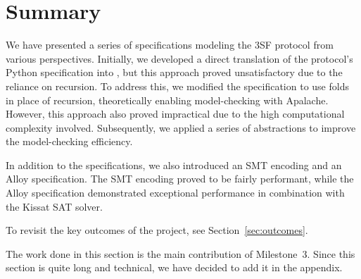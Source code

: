\documentclass[12pt]{article}
\begin{document}
\section{Summary}\label{sec:summary}
We have presented a series of specifications modeling the 3SF protocol from
various perspectives. Initially, we developed a direct translation of the
protocol's Python specification into \tlap{}, but this approach proved
unsatisfactory due to the reliance on recursion. To address this, we modified
the specification to use folds in place of recursion, theoretically enabling
model-checking with Apalache. However, this approach also proved impractical
due to the high computational complexity involved. Subsequently, we applied a
series of abstractions to improve the model-checking efficiency.

In addition to the \tlap{} specifications, we also introduced an SMT encoding
and an Alloy specification. The SMT encoding proved to be fairly performant,
while the Alloy specification demonstrated exceptional performance in
combination with the Kissat SAT solver.

To revisit the key outcomes of the project, see Section~\ref{sec:outcomes}.




\pagebreak

\appendix

The work done in this section is the main contribution of Milestone~3. Since
this section is quite long and technical, we have decided to add it in the
appendix.




\end{document}

